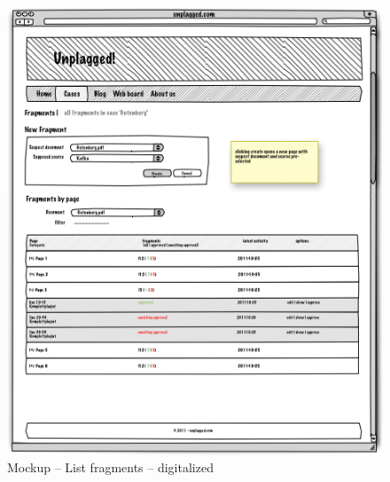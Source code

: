 \begin{appendix}
\begin{figure}[!h]
  \centering
    \includegraphics[width=\textwidth]{mockups/2_list_fragments.png}
  \caption{Mockup – List fragments – digitalized }
  \label{fig:2listFragmentsMockup}
\end{figure}


\end{appendix}
